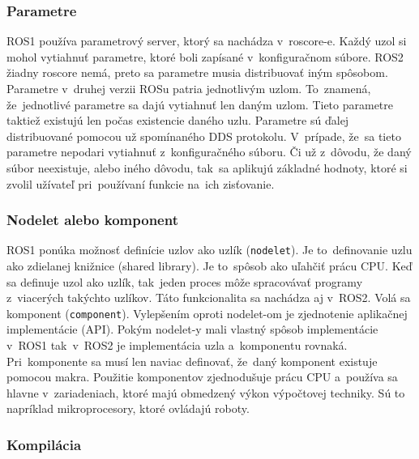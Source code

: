 \subsubsection{Parametre}

	ROS1 používa parametrový server, ktorý sa nachádza v~roscore-e. Každý uzol si mohol vytiahnuť parametre, ktoré boli zapísané v~konfiguračnom
	súbore. ROS2 žiadny roscore nemá, preto sa parametre musia distribuovať iným spôsobom. Parametre v~druhej verzii ROSu patria jednotlivým uzlom.
	To~znamená, že~jednotlivé parametre sa dajú vytiahnuť len daným uzlom. Tieto parametre taktiež existujú len počas existencie daného uzlu. Parametre
	sú ďalej distribuované pomocou už spomínaného DDS protokolu. V~prípade, že~sa tieto parametre nepodari vytiahnuť z~konfiguračného súboru. Či už z~dôvodu,
	že daný súbor neexistuje, alebo iného dôvodu, tak~sa aplikujú základné hodnoty, ktoré si zvolil užívateľ pri~používaní funkcie na~ich zisťovanie.

\subsubsection{Nodelet alebo komponent}

	ROS1 ponúka možnosť definície uzlov ako uzlík (\texttt{nodelet}). Je to~definovanie uzlu ako zdielanej knižnice (shared library). Je
	to~spôsob ako uľahčiť prácu CPU. Keď sa definuje uzol ako uzlík, tak~jeden proces môže spracovávať programy z~viacerých takýchto uzlíkov.
	Táto funkcionalita sa nachádza aj v~ROS2. Volá sa komponent (\texttt{component}). Vylepšením oproti nodelet-om je zjednotenie aplikačnej
	implementácie (API). Pokým nodelet-y mali vlastný spôsob implementácie v~ROS1 tak~v~ROS2 je implementácia uzla a~komponentu rovnaká.
	Pri~komponente sa musí len naviac definovať, že~daný komponent existuje pomocou makra. Použitie komponentov zjednodušuje prácu CPU
	a~používa sa hlavne v~zariadeniach, ktoré majú obmedzený výkon výpočtovej techniky. Sú to napríklad mikroprocesory, ktoré ovládajú roboty.

\subsubsection{Kompilácia}

